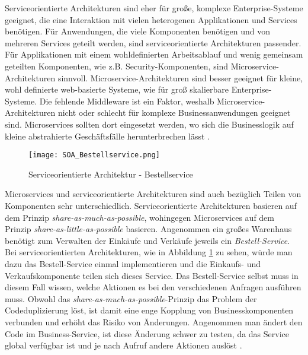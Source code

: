 Serviceorientierte Architekturen sind eher für große, komplexe Enterprise-Systeme geeignet, die eine Interaktion mit vielen heterogenen Applikationen und Services benötigen. Für Anwendungen, die viele Komponenten benötigen und von mehreren Services geteilt werden, sind serviceorientierte Architekturen passender.
Für Applikationen mit einem wohldefinierten Arbeitsablauf und wenig gemeinsam geteilten Komponenten, wie z.B. Security-Komponenten, sind Microservice-Architekturen sinnvoll.
Microservice-Architekturen sind besser geeignet für kleine, wohl definierte web-basierte Systeme, wie für groß skalierbare Enterprise-Systeme. Die fehlende Middleware ist ein Faktor, weshalb Microservice-Architekturen nicht oder schlecht für komplexe Businessanwendungen geeignet sind. Microservices sollten dort eingesetzt werden, wo sich die Businesslogik auf kleine abstrahierte Geschäftsfälle herunterbrechen lässt \cite[Kapitel 2]{MicroservicesVSSOA}.

\begin{figure}[H]
	\begin{center}
		\texttt{[image: SOA\_Bestellservice.png]}
		\caption[Serviceorientierte Architektur - Bestellservice]{Serviceorientierte Architektur - Bestellservice}
		\cite[Kapitel 3]{MicroservicesVSSOA}
		\label{fig:SOA_Bestellservice}
	\end{center}
\end{figure}

Microservices und serviceorientierte Architekturen sind auch bezüglich Teilen von Komponenten sehr unterschiedlich. Serviceorientierte Architekturen basieren auf dem Prinzip \textit{share-as-much-as-possible}, wohingegen Microservices auf dem Prinzip \textit{share-as-little-as-possible} basieren.
Angenommen ein großes Warenhaus benötigt zum Verwalten der Einkäufe und Verkäufe jeweils ein \textit{Bestell-Service}. Bei serviceorientierten Architekturen, wie in Abbildung \ref{fig:SOA_Bestellservice} zu sehen, würde man dazu das Bestell-Service einmal implementieren und die Einkaufs- und Verkaufskomponente teilen sich dieses Service. Das Bestell-Service selbst muss in diesem Fall wissen, welche Aktionen es bei den verschiedenen Anfragen ausführen muss.
Obwohl das \textit{share-as-much-as-possible}-Prinzip das Problem der Codeduplizierung löst, ist damit eine enge Kopplung von Businesskomponenten verbunden und erhöht das Risiko von Änderungen. Angenommen man ändert den Code im Business-Service, ist diese Änderung schwer zu testen, da das Service global verfügbar ist und je nach Aufruf andere Aktionen auslöst \cite[Kapitel 3]{MicroservicesVSSOA}.

